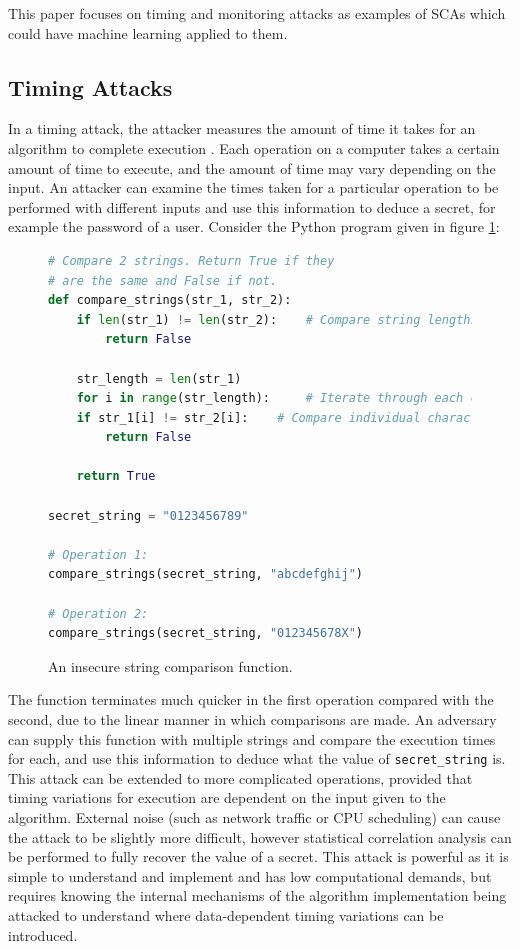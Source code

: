 \documentclass[a4paper,oneside,11pt]{article}
\begin{document}
This paper focuses on timing and monitoring attacks as examples of SCAs which
could have machine learning applied to them.



\subsection{Timing Attacks}
\label{sec:timing-attacks}

In a timing attack, the attacker measures the amount of time it takes for an
algorithm to complete execution \cite{A/Kocher-1996-Timing}. Each operation on
a computer takes a certain amount of time to execute, and the amount of time
may vary depending on the input. An attacker can examine the times taken for a
particular operation to be performed with different inputs and use this
information to deduce a secret, for example the password of a user. Consider
the Python program given in figure \ref{src:str-comp-function}:

\begin{figure}[h]
	\begin{lstlisting}[language=Python]
# Compare 2 strings. Return True if they
# are the same and False if not.
def compare_strings(str_1, str_2):
    if len(str_1) != len(str_2):    # Compare string lengths.
    	return False

    str_length = len(str_1)
    for i in range(str_length):     # Iterate through each character.
	if str_1[i] != str_2[i]:    # Compare individual characters.
	    return False

    return True

secret_string = "0123456789"

# Operation 1:
compare_strings(secret_string, "abcdefghij")

# Operation 2:
compare_strings(secret_string, "012345678X")
	\end{lstlisting}

	\caption{An insecure string comparison function.}
	\label{src:str-comp-function}
\end{figure}

The function terminates much quicker in the first operation compared with the
second, due to the linear manner in which comparisons are made. An adversary
can supply this function with multiple strings and compare the execution times
for each, and use this information to deduce what the value of
\texttt{secret\_string} is. This attack can be extended to more complicated
operations, provided that timing variations for execution are dependent on the
input given to the algorithm. External noise (such as network traffic or CPU
scheduling) can cause the attack to be slightly more difficult, however
statistical correlation analysis can be performed to fully recover the value of
a secret. This attack is powerful as it is simple to understand and implement
and has low computational demands, but requires knowing the internal
mechanisms of the algorithm implementation being attacked to understand where
data-dependent timing variations can be introduced.
\end{document}
